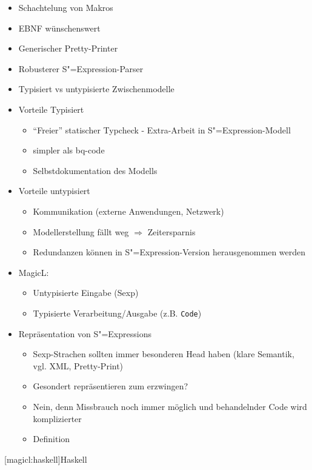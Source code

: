 \documentclass[a4paper, bibgerm]{book}
\newcommand\icode[1]{\lstinline?#1?}
\newcommand\lsection{}
\newcommand{\sexp}{S"=Expression}
\newcommand{\sexps}{S"=Expressions}
\begin{document}
\begin{itemize}
\item Schachtelung von Makros
\item EBNF wünschenswert
\item Generischer Pretty-Printer
\item Robusterer \sexp-{Parser} 
\item Typisiert vs untypisierte Zwischenmodelle
\item Vorteile Typisiert
  \begin{itemize}
  \item "`Freier"' statischer Typcheck - Extra-Arbeit in \sexp{}-Modell
  \item simpler als bq-code
  \item Selbstdokumentation des Modells
  \end{itemize}
\item Vorteile untypisiert
  \begin{itemize}
  \item Kommunikation (externe Anwendungen, Netzwerk)
  \item Modellerstellung fällt weg $\Rightarrow$ Zeitersparnis
  \item Redundanzen können in \sexp{}-Version herausgenommen werden
  \end{itemize}
\item MagicL:
  \begin{itemize}
  \item Untypisierte Eingabe (Sexp)
  \item Typisierte Verarbeitung/Ausgabe (z.B. \icode{Code})
  \end{itemize}
\item Repräsentation von \sexps{}
  \begin{itemize}
  \item Sexp-Strachen sollten immer besonderen Head haben (klare
    Semantik, vgl. XML, Pretty-Print)
  \item Gesondert repräsentieren zum erzwingen?
  \item Nein, denn Missbrauch noch immer möglich und behandelnder Code
    wird komplizierter
  \item Definition
  \end{itemize}
\end{itemize}

\lsection[magicl:haskell]{Haskell}
\end{document}
